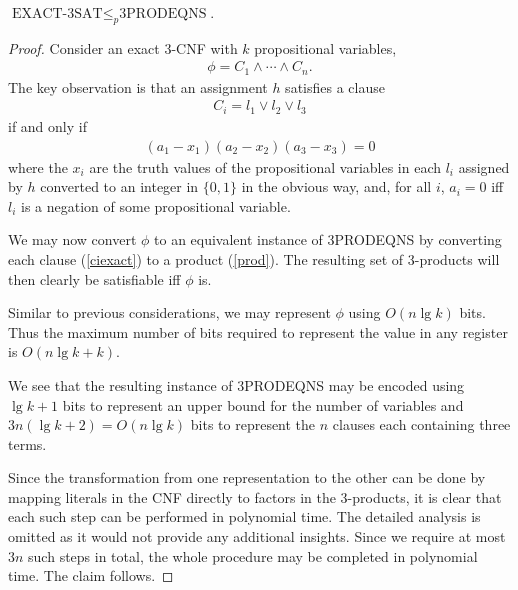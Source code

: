 \documentclass{article}
\begin{document}
\begin{claim*}[b]
	$\text{EXACT-3SAT}\leq_p\text{3PRODEQNS}$.
	\begin{proof}
		Consider an exact 3-CNF with $k$ propositional variables,
		\begin{align*}
			\phi = C_1 \wedge \cdots \wedge C_n.
		\end{align*}
		The key observation is that an assignment $h$ satisfies a clause
		\begin{align}
			\label{ciexact}
			C_i = l_1 \vee l_2 \vee l_3
		\end{align}
		if and only if
		\begin{align}
			\label{prod}
			(a_1-x_1)(a_2-x_2)(a_3-x_3) = 0
		\end{align}
		where the $x_i$ are the truth values of the propositional variables in each $l_i$ assigned
		by $h$ converted to an integer in $\{0,1\}$ in the obvious way, and, for all $i$, $a_i=0$
		iff $l_i$ is a negation of some propositional variable.

		We may now convert $\phi$ to an equivalent instance of 3PRODEQNS by converting each clause
		(\ref{ciexact}) to a product (\ref{prod}). The resulting set of 3-products will then clearly
		be satisfiable iff $\phi$ is.

		Similar to previous considerations, we may represent $\phi$ using $O(n\lg k)$ bits.
		Thus the maximum number of bits required to represent the value in any register is $O(n\lg k + k)$.

		We see that the resulting instance of 3PRODEQNS may be encoded using $\lg k+1$ bits to represent
		an upper bound for the number of variables and $3n(\lg k + 2)=O(n\lg k)$ bits to represent the $n$
		clauses each containing three terms.

		Since the transformation from one representation to the other can be done by mapping literals in the CNF
		directly to factors in the 3-products, it is clear that each such step can be performed in polynomial time.
		The detailed analysis is omitted as it would not provide any additional insights.
		Since we require at most $3n$ such steps in total, the whole procedure may be completed
		in polynomial time. The claim follows.
	\end{proof}
\end{claim*}
\end{document}
